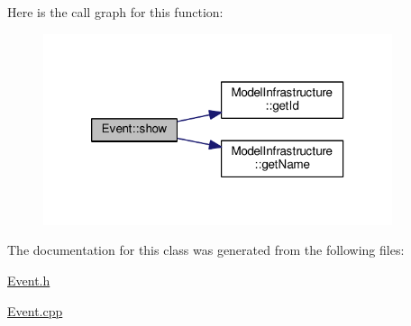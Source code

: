 Here is the call graph for this function\-:\nopagebreak
\begin{figure}[H]
\begin{center}
\leavevmode
\includegraphics[width=290pt]{class_event_a640f132001d454af52cb0d0e20ebb856_cgraph}
\end{center}
\end{figure}




The documentation for this class was generated from the following files\-:\begin{DoxyCompactItemize}
\item 
\hyperlink{_event_8h}{Event.\-h}\item 
\hyperlink{_event_8cpp}{Event.\-cpp}\end{DoxyCompactItemize}
